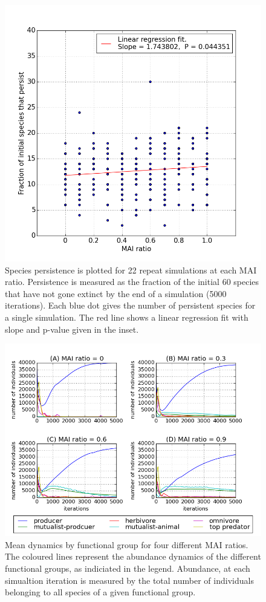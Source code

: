 \begin{figure}
	\centering
	\includegraphics[width=0.6\linewidth]{"figures/mvp1_22reps"}
	\caption{Species persistence is plotted for 22 repeat simulations at each MAI ratio. Persistence is measured as the fraction of the initial 60 species that have not gone extinct by the end of a simulation (5000 iterations). Each blue dot gives the number of persistent species for a single simulation. The red line shows a linear regression fit with slope and p-value given in the inset.}
	\label{fig:mai_vs_persistence}
\end{figure}

\begin{figure}
	\centering
	\includegraphics[width=1.0\linewidth]{"figures/mean_trophic_dynamics"}
	\caption{Mean dynamics by functional group for four different MAI ratios. The coloured lines represent the abundance dynamics of the different functional groups, as indiciated in the legend. Abundance, at each simualtion iteration is measured by the total number of individuals belonging to all species of a given functional group.}
	\label{fig:mvp_mean_dynamics}
\end{figure}

